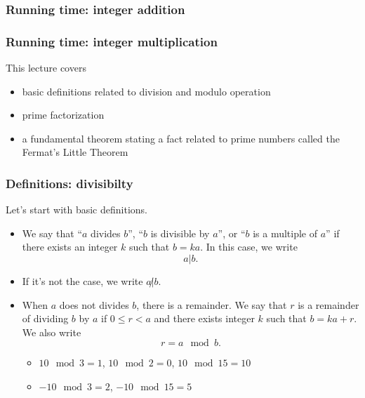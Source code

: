\begin{frame}\frametitle{Running time: integer addition}
  
\end{frame}

\begin{frame}\frametitle{Running time: integer multiplication}
\end{frame}

\begin{frame}
  This lecture covers
  \begin{itemize}
  \item basic definitions related to division and modulo operation
  \item prime factorization
  \item a fundamental theorem stating a fact related to prime numbers
    called the Fermat's Little Theorem
  \end{itemize}
\end{frame}

\begin{frame}\frametitle{Definitions: divisibilty}
  Let's start with basic definitions.
  \begin{itemize}
  \item We say that ``$a$ divides $b$'', ``$b$ is divisible by $a$'',
    or ``$b$ is a multiple of $a$'' if there exists an integer $k$
    such that $b = ka$.  In this case, we write \[a|b.\]
  \item If it's not the case, we write $a\not| b$.
  \item When $a$ does not divides $b$, there is a remainder.  We say
    that $r$ is a remainder of dividing $b$ by $a$ if $0\leq r<a$ and
    there exists integer $k$ such that $b = ka + r$.  We also write
    \[ r = a\mod b.\]
    \begin{itemize}
    \item $10\mod 3 = 1$, $10\mod 2 = 0$, $10\mod 15=10$
    \item $-10\mod 3 = 2$, $-10\mod 15=5$
    \end{itemize}
  \end{itemize}
\end{frame}

